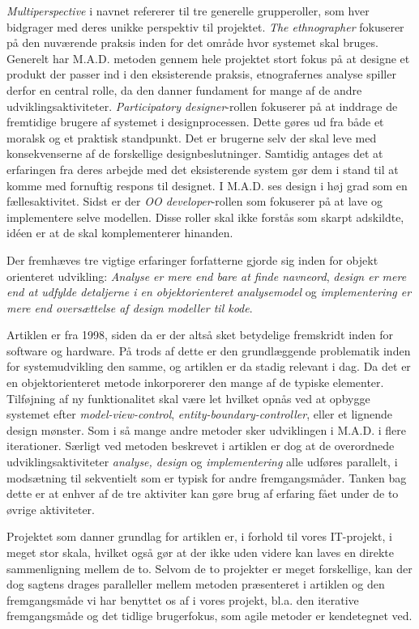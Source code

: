 \documentclass[11pt, a4paper]{article}
\begin{document}
\emph{Multiperspective} i navnet refererer til tre generelle grupperoller, som hver bidgrager med deres unikke perspektiv til projektet. 
\emph{The ethnographer} fokuserer på den nuværende praksis inden for det område hvor systemet skal bruges. Generelt har M.A.D. metoden gennem hele projektet stort fokus på at designe et produkt der passer ind i den eksisterende praksis, etnografernes analyse spiller derfor en central rolle, da den danner fundament for mange af de andre udviklingsaktiviteter. \emph{Participatory designer}-rollen fokuserer på at inddrage de fremtidige brugere af systemet i designprocessen. Dette gøres ud fra både et moralsk og et praktisk standpunkt. Det er brugerne selv der skal leve med konsekvenserne af de forskellige designbeslutninger. Samtidig antages det at erfaringen fra deres arbejde med det eksisterende system gør dem i stand til at komme med fornuftig respons til designet. I M.A.D. ses design i høj grad som en fællesaktivitet. Sidst er der \emph{OO developer}-rollen som fokuserer på at lave og implementere selve modellen. Disse roller skal ikke forstås som skarpt adskildte, idéen er at de skal komplementerer hinanden.

Der fremhæves tre vigtige erfaringer forfatterne gjorde sig inden for objekt orienteret udvikling: \emph{Analyse er mere end bare at finde navneord}, \emph{design er mere end at udfylde detaljerne i en objektorienteret analysemodel} og \emph{implementering er mere end oversættelse af design modeller til kode}.

Artiklen er fra 1998, siden da er der altså sket betydelige fremskridt inden for software og hardware. På trods af dette er den grundlæggende problematik inden for systemudvikling den samme, og artiklen er da stadig relevant i dag. Da det er en objektorienteret metode inkorporerer den mange af de typiske elementer. Tilføjning af ny funktionalitet skal være let hvilket opnås ved at opbygge systemet efter \emph{model-view-control}, \emph{entity-boundary-controller}, eller et lignende design mønster. Som i så mange andre metoder sker udviklingen i M.A.D. i flere iterationer. Særligt ved metoden beskrevet i artiklen er dog at de overordnede udviklingsaktiviteter \emph{analyse, design} og \emph{implementering} alle udføres parallelt, i modsætning til sekventielt som er typisk for andre fremgangsmåder. Tanken bag dette er at enhver af de tre aktiviter kan gøre brug af erfaring fået under de to øvrige aktiviteter.

Projektet som danner grundlag for artiklen er, i forhold til vores IT-projekt, i meget stor skala, hvilket også gør at der ikke uden videre kan laves en direkte sammenligning mellem de to. Selvom de to projekter er meget forskellige, kan der dog sagtens drages paralleller mellem metoden præsenteret i artiklen og den fremgangsmåde vi har benyttet os af i vores projekt, bl.a. den iterative fremgangsmåde og det tidlige brugerfokus, som agile metoder er kendetegnet ved.
\end{document}
